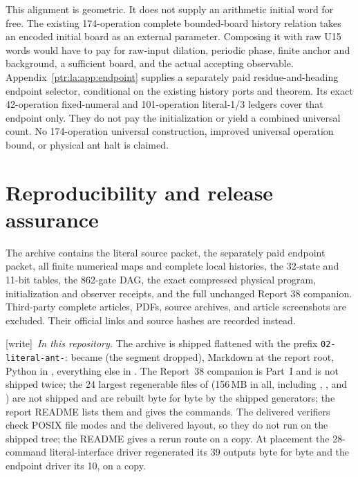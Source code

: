 \documentclass[11pt,letterpaper]{article}
\theoremstyle{definition}\newtheorem{definition}[theorem]{Definition}
\theoremstyle{remark}\newtheorem{remark}[theorem]{Remark}
\newcommand{\wtag}{\textup{[write]}}
\begin{document}
This alignment is geometric. It does not supply an arithmetic initial word for free. The existing 174-operation complete bounded-board history relation takes an encoded initial board as an external parameter. Composing it with raw U15 words would have to pay for raw-input dilation, periodic phase, finite anchor and background, a sufficient board, and the actual accepting observable. Appendix~\ref{ptr:la:app:endpoint} supplies a separately paid residue-and-heading endpoint selector, conditional on the existing history ports and theorem. Its exact 42-operation fixed-numeral and 101-operation literal-1/3 ledgers cover that endpoint only. They do not pay the initialization or yield a combined universal count. No 174-operation universal construction, improved universal operation bound, or physical ant halt is claimed.

\section{Reproducibility and release assurance}\label{ptr:la:sec:repro}
The archive contains the literal source packet, the separately paid endpoint packet, all finite numerical maps and complete local histories, the 32-state and 11-bit tables, the 862-gate DAG, the exact compressed physical program, initialization and observer receipts, and the full unchanged Report 38 companion. Third-party complete articles, PDFs, source archives, and article screenshots are excluded. Their official links and source hashes are recorded instead.

{\small\wtag\ \emph{In this repository.} The archive is shipped flattened
with the prefix \texttt{02-literal-ant-}:  became
 (the segment  dropped), Markdown at
the report root, Python in , everything else in .
The Report~38 companion is Part~I and is not shipped twice; the 24 largest
regenerable files of  (156\,MB in all, including
, ,
 and ) are not
shipped and are rebuilt byte for byte by the shipped generators; the report
README lists them and gives the commands. The delivered verifiers check POSIX
file modes and the delivered layout, so they do not run on the shipped tree;
the README gives a rerun route on a copy. At placement the 28-command
literal-interface driver regenerated its 39 outputs byte for byte and the
endpoint driver its 10, on a copy.\par}
\end{document}
